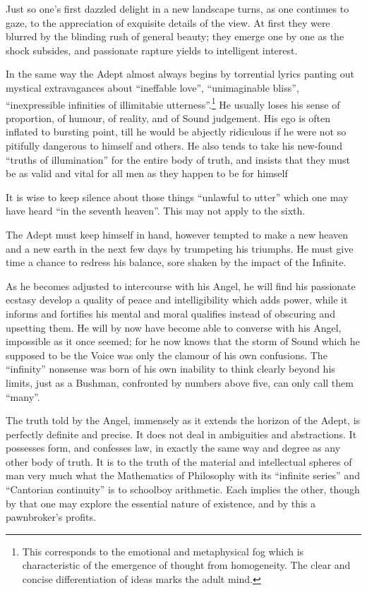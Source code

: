 Just so one’s first dazzled delight in a new landscape turns, as one continues to gaze, to the appreciation of exquisite details of the view. At first they were blurred by the blinding rush of general beauty; they emerge one by one as the shock subsides, and passionate rapture yields to intelligent interest.

In the same way the Adept almost always begins by torrential lyrics panting out mystical extravagances about \enquote{ineffable love}, \enquote{unimaginable bliss}, \enquote{inexpressible infinities of illimitabie utterness}.\footnote{This corresponds to the emotional and metaphysical fog which is characteristic of the emergence of thought from homogeneity. The clear and concise differentiation of ideas marks the adult mind.} He usually loses his sense of proportion, of humour, of reality, and of Sound judgement. His ego is often inflated to bursting point, till he would be abjectly ridiculous if he were not so pitifully dangerous to himself and others. He also tends to take his new-found \enquote{truths of illumination} for the entire body of truth, and insists that they must be as valid and vital for all men as they happen to be for himself

It is wise to keep silence about those things \enquote{unlawful to utter} which one may have heard \enquote{in the seventh heaven}. This may not apply to the sixth.

The Adept must keep himself in hand, however tempted to make a new heaven and a new earth in the next few days by trumpeting his triumphs. He must give time a chance to redress his balance, sore shaken by the impact of the Infinite.

As he becomes adjusted to intercourse with his Angel, he will find his passionate ecstasy develop a quality of peace and intelligibility which adds power, while it informs and fortifies his mental and moral qualifies instead of obscuring and upsetting them. He will by now have become able to converse with his Angel, impossible as it once seemed; for he now knows that the storm of Sound which he supposed to be the Voice was only the clamour of his own confusions. The \enquote{infinity} nonsense was born of his own inability to think clearly beyond his limits, just as a Bushman, confronted by numbers above five, can only call them \enquote{many}.

The truth told by the Angel, immensely as it extends the horizon of the Adept, is perfectly definite and precise. It does not deal in ambiguities and abstractions. It possesses form, and confesses law, in exactly the same way and degree as any other body of truth. It is to the truth of the material and intellectual spheres of man very much what the Mathematics of Philosophy with its \enquote{infinite series} and \enquote{Cantorian continuity} is to schoolboy arithmetic. Each implies the other, though by that one may explore the essential nature of existence, and by this a pawnbroker’s profits.

